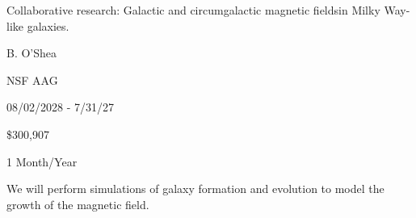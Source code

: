 
 Collaborative research: Galactic and circumgalactic magnetic
fieldsin Milky Way-like galaxies.

 B. O'Shea

 NSF AAG 

 08/02/2028 - 7/31/27

 \$300,907

 1 Month/Year

We will perform simulations of galaxy formation and evolution to model the
growth of the magnetic field.
